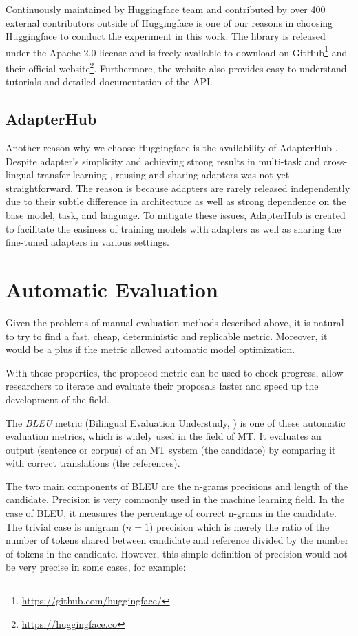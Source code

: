 Continuously maintained by Huggingface team and contributed by over 400 external contributors outside of Huggingface is one of our reasons in choosing Huggingface to conduct the experiment in this work. The library is released under the Apache 2.0 license and is freely available to download on GitHub\footnote{\url{https://github.com/huggingface/}} and their official website\footnote{\url{https://huggingface.co}}. Furthermore, the website also provides easy to understand tutorials and detailed documentation of the API.

\subsection{AdapterHub}
Another reason why we choose Huggingface is the availability of AdapterHub \cite{pfeiffer-etal-2020-adapterhub}. Despite adapter's simplicity and achieving strong results in multi-task and cross-lingual transfer learning \cite{pfeiffer2021adapterfusion,pfeiffer2020madx}, reusing and sharing adapters was not yet straightforward. The reason is because adapters are rarely released independently due to their subtle difference in architecture as well as strong dependence on the base model, task, and language. To mitigate these issues, AdapterHub is created to facilitate the easiness of training models with adapters as well as sharing the fine-tuned adapters in various settings.


\section{Automatic Evaluation}
\label{sec:aeval}
Given the problems of manual evaluation methods described above, it is natural to try to find a fast, cheap, deterministic and replicable metric. Moreover, it would be a plus if the metric allowed automatic model optimization.

With these properties, the proposed metric can be used to check progress, allow researchers to iterate and evaluate their proposals faster and speed up the development of the field.

The \textit{BLEU} metric (Bilingual Evaluation Understudy, \cite{BLEU}) is one of these automatic evaluation metrics, which is widely used in the field of MT.
It evaluates an output (sentence or corpus) of an MT system (the candidate) by comparing it with correct translations (the references).

The two main components of BLEU are the n-grams precisions and length of the candidate.
Precision is very commonly used in the machine learning field.
In the case of BLEU, it measures the percentage of correct n-grams in the candidate.
The trivial case is unigram ($n=1$) precision which is merely the ratio of the number of tokens shared between candidate and reference divided by the number of tokens in the candidate.
However, this simple definition of precision would not be very precise in some cases, for example:

